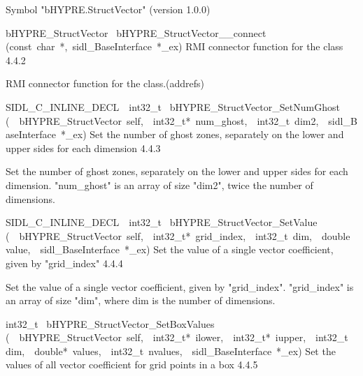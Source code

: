 \documentclass{article}
\begin{document}
\begin{cxxentry}
\begin{cxxentry}
\begin{cxxvariable}
\begin{cxxdoc}
Symbol "bHYPRE.StructVector" (version 1.0.0)
\end{cxxdoc}
\end{cxxvariable}
\begin{cxxfunction}
{bHYPRE\_StructVector\ }
        {bHYPRE\_StructVector\_\_connect}
        {(const\ char\ *,\ sidl\_BaseInterface\ *\_ex)}
        {
RMI connector function for the class}
        {4.4.2}
\begin{cxxdoc}

RMI connector function for the class.(addrefs)
\end{cxxdoc}
\end{cxxfunction}
\begin{cxxfunction}
{SIDL\_C\_INLINE\_DECL\ \ int32\_t\ }
        {bHYPRE\_StructVector\_SetNumGhost}
        {(\ \ bHYPRE\_StructVector\ self,\ \ int32\_t*\ num\_ghost,\ \ int32\_t\ dim2,\ \ sidl\_BaseInterface\ *\_ex)}
        {
Set the number of ghost zones, separately on the lower and upper sides
for each dimension}
        {4.4.3}
\begin{cxxdoc}

Set the number of ghost zones, separately on the lower and upper sides
for each dimension.
"num\_ghost" is an array of size "dim2", twice the number of dimensions. 
\end{cxxdoc}
\end{cxxfunction}
\begin{cxxfunction}
{SIDL\_C\_INLINE\_DECL\ \ int32\_t\ }
        {bHYPRE\_StructVector\_SetValue}
        {(\ \ bHYPRE\_StructVector\ self,\ \ int32\_t*\ grid\_index,\ \ int32\_t\ dim,\ \ double\ value,\ \ sidl\_BaseInterface\ *\_ex)}
        {
Set the value of a single vector coefficient, given by "grid\_index"}
        {4.4.4}
\begin{cxxdoc}

Set the value of a single vector coefficient, given by "grid\_index".
"grid\_index" is an array of size "dim", where dim is the number
of dimensions. 
\end{cxxdoc}
\end{cxxfunction}
\begin{cxxfunction}
{int32\_t\ }
        {bHYPRE\_StructVector\_SetBoxValues}
        {(\ \ bHYPRE\_StructVector\ self,\ \ int32\_t*\ ilower,\ \ int32\_t*\ iupper,\ \ int32\_t\ dim,\ \ double*\ values,\ \ int32\_t\ nvalues,\ \ sidl\_BaseInterface\ *\_ex)}
        {
Set the values of all vector coefficient for grid points in a box}
        {4.4.5}
\begin{cxxdoc}


\end{cxxdoc}
\end{cxxfunction}
\end{cxxentry}
\end{cxxentry}
\end{document}
